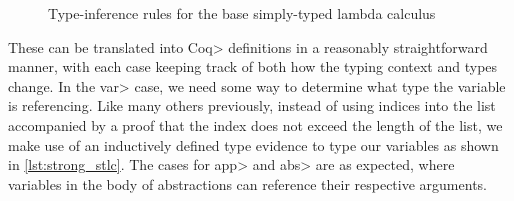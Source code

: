   \begin{figure}
    \caption{Type-inference rules for the base simply-typed lambda calculus}
    \label{fig:base_infer}
  \end{figure}

  These can be translated into \<Coq> definitions in a reasonably straightforward manner, with each case keeping track of both how the typing context and types change.
  In the \<var> case, we need some way to determine what type the variable is referencing.
  Like many others previously\cite{Benton2011}\cite{Coquand1994}, instead of using indices into the list accompanied by a proof that the index does not exceed the length of the list, we make use of an inductively defined type evidence to type our variables as shown in \cref{lst:strong_stlc}.
  The cases for \<app> and \<abs> are as expected, where variables in the body of abstractions can reference their respective arguments.

